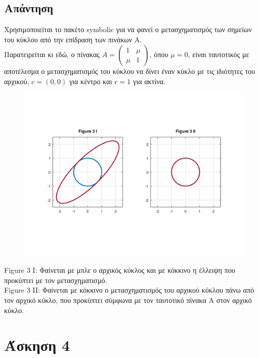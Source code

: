 \documentclass[a4paper,12pt]{article}
\begin{document}
\subsection{Απάντηση}
Χρησιμοποιείται το πακέτο symbolic για να φανεί ο μετασχηματισμός των σημείων
του κύκλου από την επίδραση των πινάκων Α.\\
Παρατειρείται κι εδώ, ο πίνακας $
	A = \begin{pmatrix}
		1   & \mu \\
		\mu & 1
	\end{pmatrix}
$, όπου $\mu = 0$, είναι ταυτοτικός με αποτέλεσμα ο μετασχηματισμός του κύκλου
να δίνει έναν κύκλο με τις ιδιότητες του αρχικού, $c=(0, 0)$ για κέντρο και
$r=1$ για ακτίνα.
\begin{center}
	\begin{figure}[H]
		\centering
		\includegraphics[scale=0.8]{3i_ii.png}
	\end{figure}
	Figure 3 I: Φαίνεται με μπλε ο αρχικός κύκλος και με κόκκινο η έλλειψη που
	προκύπτει με τον μετασχηματισμό.\\
	Figure 3 II: Φαίνεται με κόκκινο ο μετασχηματισμός του αρχικού κύκλου πάνω
	από τον αρχικό κύκλο, που προκύπτει σύμφωνα με τον ταυτοτικό πίνακα Α
	στον αρχικό κύκλο.
\end{center}
\newpage\section{Άσκηση 4}
\end{document}
